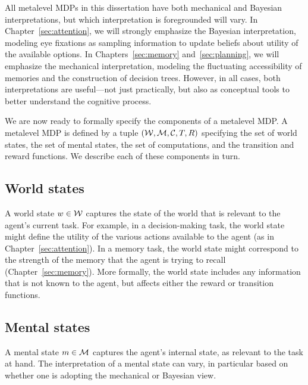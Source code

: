 All metalevel MDPs in this dissertation have both mechanical and Bayesian interpretations, but which interpretation is foregrounded will vary. In Chapter~\ref{sec:attention}, we will strongly emphasize the Bayesian interpretation, modeling eye fixations as sampling information to update beliefs about utility of the available options. In Chapters~\ref{sec:memory} and~\ref{sec:planning}, we will emphasize the mechanical interpretation, modeling the fluctuating accessibility of memories and the construction of decision trees. However, in all cases, both interpretations are useful---not just practically, but also as conceptual tools to better understand the cognitive process.

\separator

We are now ready to formally specify the components of a metalevel MDP. A metalevel MDP is defined by a tuple $(\mathcal{W}, \mathcal{M}, \mathcal{C}, T, R)$ specifying the set of world states, the set of mental states, the set of computations, and the transition and reward functions. We describe each of these components in turn.


\subsection{World states}
A world state $w \in \mathcal{W}$ captures the state of the world that is relevant to the agent's current task. For example, in a decision-making task, the world state might define the utility of the various actions available to the agent (as in Chapter~\ref{sec:attention}). In a memory task, the world state might correspond to the strength of the memory that the agent is trying to recall (Chapter~\ref{sec:memory}). More formally, the world state includes any information that is not known to the agent, but affects either the reward or transition functions.

\subsection{Mental states}

A mental state $m \in \mathcal{M}$ captures the agent's internal state, as relevant to the task at hand. The interpretation of a mental state can vary, in particular based on whether one is adopting the mechanical or Bayesian view. 

